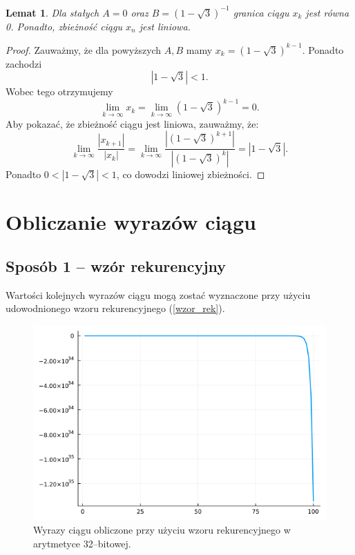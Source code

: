\documentclass{article}
\newtheorem{lem}{Lemat}[section]
\begin{document}
\begin{lem}
    \label{lem:granica}
    Dla stałych \(A=0\) oraz \(B = (1 - \sqrt{3})^{-1}\) granica ciągu \(x_k\) jest równa 0. Ponadto, zbieżność ciągu \(x_n\) jest liniowa. 
\end{lem}

\begin{proof}
    Zauważmy, że dla powyższych \(A,B\) mamy \(x_k = (1 - \sqrt{3})^{k-1}\). Ponadto zachodzi 
    \[
        \left| 1 - \sqrt{3} \right| < 1 \text{.}
    \]
    Wobec tego otrzymujemy
    \[
        \lim_{k \to \infty} x_k = \lim_{k \to \infty} (1 - \sqrt{3})^{k-1} = 0 \text{.}
    \]
    Aby pokazać, że zbieżność ciągu jest liniowa, zauważmy, że:
    \[
        \lim_{k \to \infty} \frac{\left| x_{k+1} \right|}{\left| x_k \right|} = 
        \lim_{k \to \infty} \frac{\left| (1-\sqrt{3})^{k+1} \right|}{\left| (1-\sqrt{3})^k \right|} = \left| 1-\sqrt{3} \right| \text{.}
    \]
    Ponadto \(0 < \left|  1-\sqrt{3} \right| < 1\), co dowodzi liniowej zbieżności. 
\end{proof}


\newpage

\section{Obliczanie wyrazów ciągu}

\subsection{Sposób 1 -- wzór rekurencyjny}

Wartości kolejnych wyrazów ciągu mogą zostać wyznaczone przy użyciu udowodnionego wzoru rekurencyjnego (\ref{wzor_rek}).


\begin{figure}[!h]
    \centering
    \includegraphics[scale=0.4]{plot32_1.png}
    \caption{Wyrazy ciągu obliczone przy użyciu wzoru rekurencyjnego w arytmetyce 32--bitowej.}
    \label{fig:plot32_1}
\end{figure}
\end{document}
